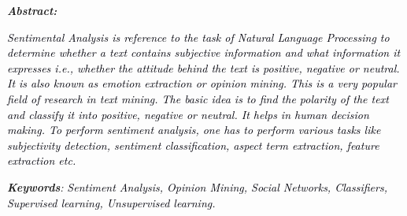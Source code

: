 \documentclass[12pt]{article}
\begin{document}
 \par


\tableofcontents
\listoffigures
\listoftables
 \par

\begin{justify}
{\fontsize{14pt}{16.8pt}\selectfont \textbf{\textit{ }}\par}
\end{justify}\par


\newpage



\begin{justify}
{\fontsize{14pt}{16.8pt}\selectfont \textbf{\textit{Abstract:}}\par}
\end{justify}\par

\begin{justify}
\textit{\textcolor[HTML]{00000A}{Sentimental Analysis is reference to the task of Natural Language Processing to determine whether a text contains subjective information and what information it expresses i.e., whether the attitude behind the text is positive, negative or neutral. It is also known as emotion extraction or opinion mining. This is a very popular field of research in text mining. The basic idea is to find the polarity of the text and classify it into positive, negative or neutral. It helps in human decision making. To perform sentiment analysis, one has to perform various tasks like subjectivity detection, sentiment classification, aspect term extraction, feature extraction etc.}}
\end{justify}\par


\vspace{\baselineskip}
\begin{justify}
{\fontsize{14pt}{16.8pt}\selectfont \textbf{\textit{Keywords}}\textit{:} \textit{\textcolor[HTML]{00000A}{Sentiment Analysis, Opinion Mining, Social Networks, Classifiers, Supervised learning, Unsupervised learning.}}\par}
\end{justify}\par


\newpage



\newpage
\end{document}
